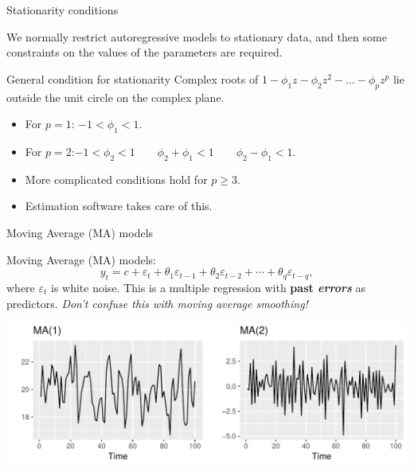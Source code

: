 \documentclass[14pt,ignorenonframetext,]{beamer}
\providecommand{\tightlist}{%
  \setlength{\itemsep}{0pt}\setlength{\parskip}{0pt}}
\begin{document}
\begin{frame}{Stationarity conditions}

We normally restrict autoregressive models to stationary data, and then
some constraints on the values of the parameters are required.

\begin{block}{General condition for stationarity}
Complex roots of $1-\phi_1 z - \phi_2 z^2 - \dots - \phi_pz^p$ lie outside the unit circle on the complex plane.
\end{block}

\pause

\begin{itemize}
\tightlist
\item
  For \(p=1\): \(-1<\phi_1<1\).
\item
  For
  \(p=2\):\newline \(-1<\phi_2<1\qquad \phi_2+\phi_1 < 1 \qquad \phi_2 -\phi_1 < 1\).
\item
  More complicated conditions hold for \(p\ge3\).
\item
  Estimation software takes care of this.
\end{itemize}

\end{frame}

\begin{frame}{Moving Average (MA) models}

\begin{block}{Moving Average (MA) models:}
$$
  y_{t}  =  c +  \varepsilon_t + \theta_{1}\varepsilon_{t - 1}  +  \theta_{2}\varepsilon_{t - 2}  +  \cdots  + \theta_{q}\varepsilon_{t - q},
$$
where $\varepsilon_t$ is white noise.
This is a multiple regression with  \textbf{past \emph{errors}}
as predictors. \emph{Don't confuse this with moving average smoothing!}
\end{block}

\includegraphics{week_5_arima_files/figure-beamer/maq-1.pdf}

\end{frame}
\end{document}
